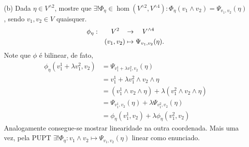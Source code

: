 (b) Dada \(\eta \in V^{\wedge 2 }\), mostre que \(\exists ! \Phi_\eta \in \hom (V^{\wedge 2},V^{\wedge 4}) : \Phi_\eta(v_1 \wedge v_2) = \Psi_{v_1,v_2}(\eta)\), sendo \(v_1, v_2 \in V\) quaisquer.  \\
\textcolor{gris}{ 
  \-\vspace{-0.3cm}
  \begin{align*}
    \phi_\eta : \hspace{0.6cm}V^2\hspace{0.3cm} &\to \hspace{0.35cm}V^{\wedge 4}\\ 
    (v_1, v_2) &\mapsto \Psi_{v_1, v_2}(\eta).
  \end{align*}
  Note que \(\phi\) é bilinear, de fato, 
  \begin{align*}
    \phi_\eta(v_1^1+\lambda v_1^2, v_2) &= \Psi_{v_1^1+\lambda v_1^2, v_2}(\eta)\\ 
    &= v_1^1+\lambda v_1^2 \wedge v_2 \wedge \eta \\
    &= (v_1^1\wedge v_2 \wedge \eta) +\lambda( v_1^2 \wedge v_2 \wedge \eta) \\
    & = \Psi_{v_1^1, v_2}(\eta) +\lambda \Psi_{v_1^2, v_2}(\eta)\\
    &= \phi_\eta(v_{1}^1, v_2) + \lambda\phi_\eta(v_{1}^2, v_2)
  \end{align*}
Analogamente consegue-se mostrar linearidade na outra coordenada. Mais uma vez, pela PUPT \(\exists ! \Phi_\eta: v_1 \wedge v_2 \mapsto \Psi_{v_1,v_2} (\eta)\) linear como enunciado.   
}

